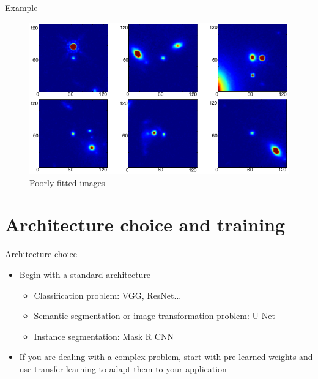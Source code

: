 \documentclass[xcolor=pdftex,dvipsnames,table,mathserif]{beamer}
\begin{document}
\begin{frame}{Example~\tiny\cite{tuccillo_deep_2018}}


    \begin{figure}[ht]
      \centering
      \includegraphics[width=\textwidth]{tuccillo_poorly_fitted}
      Poorly fitted images
    \end{figure}

\end{frame}


\section{Architecture choice and training}

\begin{frame}{Architecture choice}

  \begin{itemize}[<+->]
  \item Begin with a standard architecture
    \begin{itemize}
    \item Classification problem: VGG, ResNet...
    \item Semantic segmentation or image transformation problem: U-Net
    \item Instance segmentation: Mask R CNN
    \end{itemize}
  \item If you are dealing with a complex problem, start with pre-learned weights and use transfer learning to adapt them to your application
  \end{itemize}



\end{frame}
\end{document}
